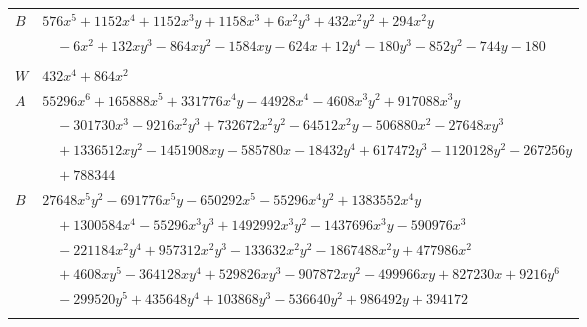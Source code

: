 \documentclass[11pt]{article}
\begin{document}
\begin{longtable}{@{}ll@{}}
$B$ & $576x^{5}+1152x^{4}+1152x^{3}y+1158x^{3}+6x^{2}y^{3}+432x^{2}y^{2}+294x^{2}y$\\
 & $\quad -6x^{2}+132xy^{3}-864xy^{2}-1584xy-624x+12y^{4}-180y^{3}-852y^{2}-744y-180$\\
\addlinespace[3pt]
\multicolumn{2}{@{}l}{$i=108$, $m=288$, neighbours $25,56,74,89,103$}\\
$W$ & $432x^{4}+864x^{2}$\\
$A$ & $55296x^{6}+165888x^{5}+331776x^{4}y-44928x^{4}-4608x^{3}y^{2}+917088x^{3}y$\\
 & $\quad -301730x^{3}-9216x^{2}y^{3}+732672x^{2}y^{2}-64512x^{2}y-506880x^{2}-27648xy^{3}$\\
 & $\quad +1336512xy^{2}-1451908xy-585780x-18432y^{4}+617472y^{3}-1120128y^{2}-267256y$\\
 & $\quad +788344$\\
$B$ & $27648x^{5}y^{2}-691776x^{5}y-650292x^{5}-55296x^{4}y^{2}+1383552x^{4}y$\\
 & $\quad +1300584x^{4}-55296x^{3}y^{3}+1492992x^{3}y^{2}-1437696x^{3}y-590976x^{3}$\\
 & $\quad -221184x^{2}y^{4}+957312x^{2}y^{3}-133632x^{2}y^{2}-1867488x^{2}y+477986x^{2}$\\
 & $\quad +4608xy^{5}-364128xy^{4}+529826xy^{3}-907872xy^{2}-499966xy+827230x+9216y^{6}$\\
 & $\quad -299520y^{5}+435648y^{4}+103868y^{3}-536640y^{2}+986492y+394172$\\
\addlinespace[3pt]
\end{longtable}
\endgroup
\end{document}

